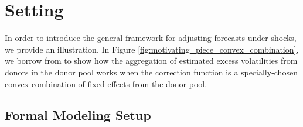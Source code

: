 \documentclass[11pt]{article}
\theoremstyle{definition}
\begin{document}
\section{Setting}\label{Setting}

In order to introduce the general framework for adjusting forecasts under shocks, we provide an illustration.  In Figure \ref{fig:motivating_piece_convex_combination}, we borrow from \cite{lundquist2024volatility} to show how the aggregation of estimated excess volatilities from donors in the donor pool works when the correction function is a specially-chosen convex combination of fixed effects from the donor pool.  

\subsection{Formal Modeling Setup}
\end{document}
